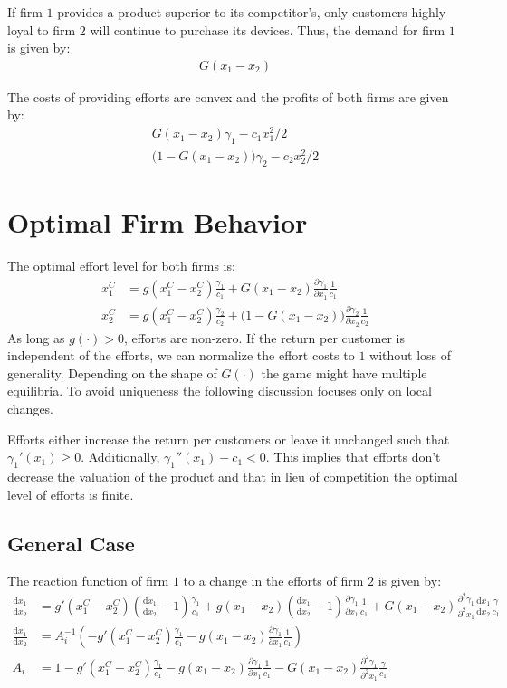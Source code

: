\documentclass[a4paper, 11pt]{article}
\renewcommand{\d}{\text{d}}
\begin{document}
If firm $1$ provides a product superior to its competitor's, only customers highly loyal to firm $2$ will continue to purchase its devices. Thus, the demand for firm $1$ is given by:
\begin{align*}
G(x_1-x_2)
\end{align*}

The costs of providing efforts are convex and the profits of both firms are given by:
\begin{align}
G(x_1-x_2)\gamma_1 - c_1x_1^2/2\\
\big(1-G(x_1-x_2)\big)\gamma_2 - c_2x_2^2/2
\end{align}

\section{Optimal Firm Behavior}

The optimal effort level for both firms is:
\begin{align}
x_1^C &= g(x_1^C-x_2^C)\frac{\gamma_1}{c_1} + G(x_1-x_2)\frac{\partial \gamma_1}{\partial x_1}\frac{1}{c_1}\\
x_2^C &= g(x_1^C-x_2^C)\frac{\gamma_2}{c_2} + \big(1-G(x_1-x_2)\big)\frac{\partial \gamma_2}{\partial x_2}\frac{1}{c_2}
\end{align}
As long as $g(\cdot)>0$, efforts are non-zero. If the return per customer is independent of the efforts, we can normalize the effort costs to $1$ without loss of generality. Depending on the shape of $G(\cdot)$ the game might have multiple equilibria. To avoid uniqueness the following discussion focuses only on local changes. 

Efforts either increase the return per customers or leave it unchanged such that $\gamma_1'(x_1)\geq 0$. Additionally, $\gamma_1''(x_1) - c_1<0$. This implies that efforts don't decrease the valuation of the product and that in lieu of competition the optimal level of efforts is finite.

\subsection{General Case}
The reaction function of firm $1$ to a change in the efforts of firm $2$ is given by:
\begin{align}
\frac{\d x_1}{\d x_2} &= g'(x_1^C-x_2^C)\left(\frac{\d x_1}{\d x_2}-1\right)\frac{\gamma_1}{c_1} + g(x_1-x_2)\left(\frac{\d x_1}{\d x_2}-1\right)\frac{\partial \gamma_1}{\partial x_1}\frac{1}{c_1} + G(x_1-x_2)\frac{\partial^2 \gamma_1}{\partial^2 x_1}\frac{\d x_1}{\d x_2}\frac{\gamma}{c_1}\\
\frac{\d x_1}{\d x_2} &= A_i^{-1} \left(-g'(x_1^C-x_2^C)\frac{\gamma_1}{c_1} - g(x_1-x_2)\frac{\partial \gamma_1}{\partial x_1}\frac{1}{c_1}\right)\\
A_i &= 1 - g'(x_1^C-x_2^C)\frac{\gamma_1}{c_1}-g(x_1-x_2)\frac{\partial \gamma_1}{\partial x_1}\frac{1}{c_1}-G(x_1-x_2)\frac{\partial^2 \gamma_1}{\partial^2 x_1}\frac{\gamma}{c_1}
\end{align}
\end{document}
